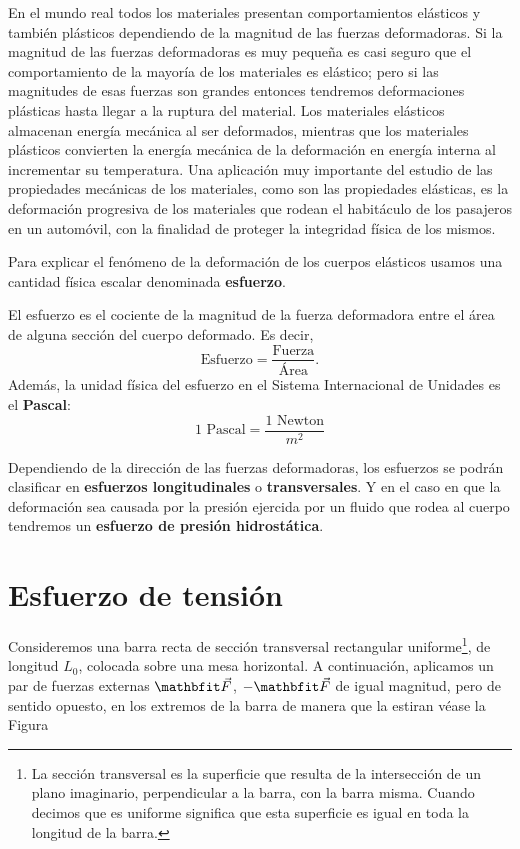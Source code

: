 En el mundo real todos los materiales presentan comportamientos elásticos y también plásticos dependiendo de la magnitud de las fuerzas deformadoras. Si la magnitud de las fuerzas deformadoras es muy pequeña es casi seguro que el comportamiento de la mayoría de los materiales es elástico; pero si las magnitudes de esas fuerzas son grandes entonces tendremos deformaciones plásticas hasta llegar a la ruptura del material. Los materiales elásticos almacenan energía mecánica al ser deformados, mientras que los materiales plásticos convierten la energía mecánica de la deformación en energía interna al incrementar su temperatura. Una aplicación muy importante del estudio de las propiedades mecánicas de los materiales, como son las propiedades elásticas, es la deformación progresiva de los materiales que rodean el habitáculo de los pasajeros en un automóvil, con la finalidad de proteger la integridad física de los mismos.

Para explicar el fenómeno de la deformación de los cuerpos elásticos usamos una cantidad física escalar denominada \textbf{esfuerzo}.
\begin{definition}{}{}
    El esfuerzo es el cociente de la magnitud de la fuerza deformadora entre el área de alguna sección del cuerpo deformado. Es decir,
    $$\text{Esfuerzo}=\frac{\text{Fuerza}}{\text{Área}}.$$
    Además, la unidad física del esfuerzo en el Sistema Internacional de Unidades es el \textbf{Pascal}:
    $$1\text{ Pascal} = \frac{1\text{ Newton}}{m^2}$$
\end{definition}

Dependiendo de la dirección de las fuerzas deformadoras, los esfuerzos se podrán clasificar en \textbf{esfuerzos longitudinales} o \textbf{transversales}. Y en el caso en que la deformación sea causada por la presión ejercida por un fluido que rodea al cuerpo tendremos un \textbf{esfuerzo de presión hidrostática}.

\section{Esfuerzo de tensión}

Consideremos una barra recta de sección transversal rectangular uniforme\footnote{La sección transversal es la superficie que resulta de la intersección de un plano imaginario, perpendicular a la barra, con la barra misma. Cuando decimos que es uniforme significa que esta superficie es igual en toda la longitud de la barra.}, de longitud $L_0$, colocada sobre una mesa horizontal. A continuación, aplicamos un par de fuerzas externas $\F$, $-\F$ de igual magnitud, pero de sentido opuesto, en los extremos de la barra de manera que la estiran véase la Figura

